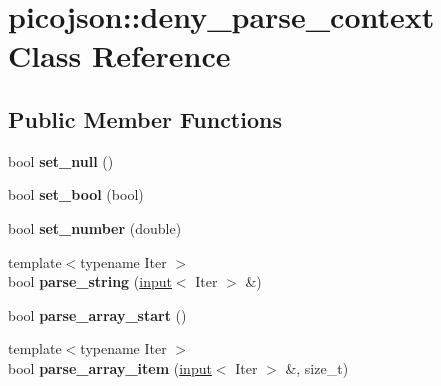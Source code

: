 \hypertarget{classpicojson_1_1deny__parse__context}{\section{picojson\-:\-:deny\-\_\-parse\-\_\-context Class Reference}
\label{classpicojson_1_1deny__parse__context}
}
\subsection*{Public Member Functions}
\begin{DoxyCompactItemize}
\item 
\hypertarget{classpicojson_1_1deny__parse__context_abadde692be9f70942cb31799292c2ad9}{bool {\bfseries set\-\_\-null} ()}\label{classpicojson_1_1deny__parse__context_abadde692be9f70942cb31799292c2ad9}

\item 
\hypertarget{classpicojson_1_1deny__parse__context_afc6a05e76120dd884da1ec4c8964f7b5}{bool {\bfseries set\-\_\-bool} (bool)}\label{classpicojson_1_1deny__parse__context_afc6a05e76120dd884da1ec4c8964f7b5}

\item 
\hypertarget{classpicojson_1_1deny__parse__context_aec324fbb7fea546b6e0673724873e1e1}{bool {\bfseries set\-\_\-number} (double)}\label{classpicojson_1_1deny__parse__context_aec324fbb7fea546b6e0673724873e1e1}

\item 
\hypertarget{classpicojson_1_1deny__parse__context_a2000b3dcc1fb70a4c795e834f9d3122f}{{\footnotesize template$<$typename Iter $>$ }\\bool {\bfseries parse\-\_\-string} (\hyperlink{classpicojson_1_1input}{input}$<$ Iter $>$ \&)}\label{classpicojson_1_1deny__parse__context_a2000b3dcc1fb70a4c795e834f9d3122f}

\item 
\hypertarget{classpicojson_1_1deny__parse__context_afbe65c8c2b2ada93595587432189d20f}{bool {\bfseries parse\-\_\-array\-\_\-start} ()}\label{classpicojson_1_1deny__parse__context_afbe65c8c2b2ada93595587432189d20f}

\item 
\hypertarget{classpicojson_1_1deny__parse__context_ae15be8ad932ec02751870e962e9d34bf}{{\footnotesize template$<$typename Iter $>$ }\\bool {\bfseries parse\-\_\-array\-\_\-item} (\hyperlink{classpicojson_1_1input}{input}$<$ Iter $>$ \&, size\-\_\-t)}\label{classpicojson_1_1deny__parse__context_ae15be8ad932ec02751870e962e9d34bf}


\end{DoxyCompactItemize}
